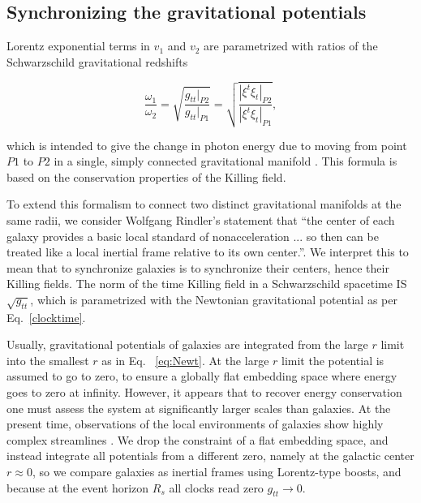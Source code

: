 \documentclass[reprint,%
 amsmath,amssymb,
 aps,
]{revtex4-1}
\begin{document}
 
    
 
\subsection{Synchronizing the gravitational potentials \label{sec:gravDets}}

  
    
    

 
Lorentz exponential terms in  $v_1$ and $v_2$ are parametrized with ratios of  the    Schwarzschild gravitational redshifts

\begin{equation}
       \frac{\omega_1}{\omega_2}  =\sqrt{\frac{g_{tt}|_{P2}}{g_{tt}|_{P1}}} =\sqrt{\frac{|\xi^t\xi_{t}|_{P2}}{|\xi^t\xi_{t}|_{P1}}},
      \label{eq:grav}
    \end{equation} 
    
which is    intended to give the change in  photon energy due to  moving from point $P1$ to $P2$ in a single, simply connected gravitational   manifold \cite{Wald}.   This formula is based on the conservation properties of the Killing field. 


To  extend this formalism   to connect 
  two distinct gravitational manifolds at the same radii, we consider  Wolfgang Rindler's statement that        ``the center of each galaxy provides a basic local standard of nonacceleration ... so then can be treated like a local inertial frame relative to its own center.''\cite{rindler2013essential}.
    We interpret this to mean  that to synchronize galaxies is    to synchronize their centers, hence their Killing fields.  The norm of the time Killing field in a Schwarzschild spacetime IS $\sqrt{g_{tt}}$, which   is  parametrized with the Newtonian gravitational potential as per
    Eq.~\ref{clocktime}. 
    
  
  Usually,   gravitational potentials of galaxies   are integrated  from the large $r$ limit into the smallest $r$ 
  as in Eq.~  \ref{eq:Newt}. At the large $r$ limit      the potential is assumed  to go to zero,   to ensure a  globally  flat embedding space where energy goes to zero at infinity. 
  However,    it appears that to recover energy conservation one must assess the system at  significantly larger scales than galaxies.
 At the present time,  observations of  the local environments of galaxies show highly complex streamlines \cite{Pomarede:2020pme,Hoffman:2017ako}. 
 We drop the constraint of a flat embedding space, and  instead integrate all    potentials    from a different  zero, namely  at the galactic center $r\approx 0$, so   we   compare galaxies as inertial frames using Lorentz-type boosts, and because at the event horizon $R_s$   all clocks read  zero   $g_{tt} \to 0$.
\end{document}
